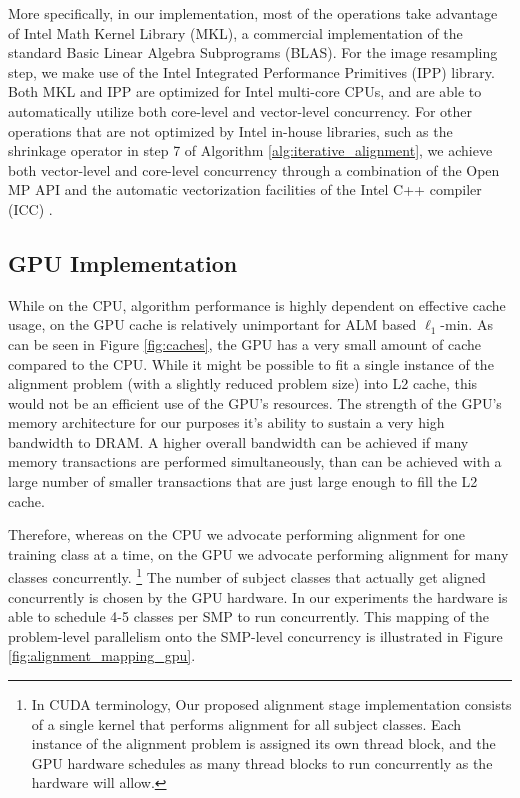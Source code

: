\documentclass[10pt,twocolumn,letterpaper]{article}
\begin{document}
More specifically, in our implementation, most of the operations take
advantage of Intel Math Kernel Library (MKL), a commercial implementation of
the standard Basic Linear Algebra Subprograms (BLAS). For the image resampling
step, we make use of the Intel Integrated Performance Primitives (IPP) library.
Both MKL and IPP are optimized for Intel multi-core CPUs, and are able to
automatically utilize both core-level and vector-level concurrency. For other
operations that are not optimized by Intel in-house libraries, such as the shrinkage
operator in step 7 of Algorithm \ref{alg:iterative_alignment}, we achieve both
vector-level and core-level concurrency through a combination of the Open MP
API \cite{dagum2002openmp} and the automatic vectorization facilities of the
Intel C++ compiler (ICC) \cite{dulong1999overview}. 

\subsection{GPU Implementation}
\label{sec:alignment_implementation_gpu}
While on the CPU, algorithm performance is highly dependent on effective
cache usage, on the GPU cache is relatively unimportant for ALM based
$\ell_1$-min.  As can be seen in Figure \ref{fig:caches}, the GPU has 
a very small amount of cache compared to the CPU.  While it might be possible
to fit a single instance of the alignment problem (with a slightly reduced problem size)
into L2 cache, this would not be an efficient use of the GPU's resources.
The strength of the GPU's memory architecture for our purposes it's ability to sustain a very
high bandwidth to DRAM.  A higher overall bandwidth can be achieved if 
many memory transactions are performed simultaneously, than can be achieved
with a large number of smaller transactions that are just large enough to fill
the L2 cache.

Therefore, whereas on the CPU we advocate performing alignment for one training
class at a time, on the GPU we advocate performing alignment for many classes
concurrently.  \footnote{In CUDA terminology, Our proposed alignment stage
implementation consists of a single kernel that performs alignment for all
subject classes.  Each instance of the alignment problem is assigned its own
thread block, and the GPU hardware schedules as many thread blocks to run
concurrently as the hardware will allow.} The number of subject classes that
actually get aligned concurrently is chosen by the GPU hardware. In our
experiments the hardware is able to schedule 4-5 classes per SMP to run
concurrently. This mapping of the problem-level parallelism onto the SMP-level
concurrency is illustrated in Figure \ref{fig:alignment_mapping_gpu}.
\end{document}
